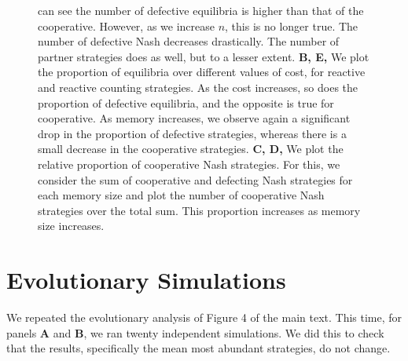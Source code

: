 \documentclass[11pt]{article}
\theoremstyle{plainCl1}
\theoremstyle{plainCl2}
\begin{document}
\begin{figure}[h]
{can see the number of defective equilibria is higher than that of the
cooperative. However, as we increase \(n\), this is no longer true. The number
of defective Nash decreases drastically. The number of partner strategies does
as well, but to a lesser extent.
{\bf B, E,} We plot the proportion of equilibria over different values of cost, for reactive
and reactive counting strategies. As the cost increases, so does the
proportion of defective equilibria, and the opposite is true for cooperative. As
memory increases, we observe again a significant drop in the proportion of
defective strategies, whereas there is a small decrease in the cooperative
strategies. 
{\bf C, D,} We plot the relative proportion of cooperative Nash strategies. For
this, we consider the sum of cooperative and defecting Nash strategies for each
memory size and plot the number of cooperative Nash strategies over the total
sum. This proportion increases as memory size increases.
}\label{fig:siFigDefectiveCooperativeNash}
\end{figure}



\newpage
\section{Evolutionary Simulations}

We repeated the evolutionary analysis of Figure 4 of the main text. This time,
for panels \textbf{A} and \textbf{B}, we ran twenty independent simulations. We
did this to check that the results, specifically the mean most abundant
strategies, do not change.
\end{document}

